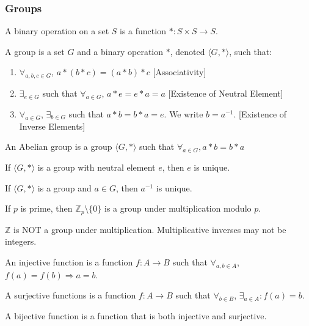 \documentclass[crop=false,class=book,oneside]{standalone}
\begin{document}
\subsubsection{Groups}
\begin{definition}
A binary operation on a set $S$ is a function $*:S\times S \rightarrow S$.
\end{definition}
\begin{definition}
A group is a set $G$ and a binary operation $*$, denoted $\langle G,*\rangle$, such that:
\begin{enumerate}
    \item $\forall_{a,b,c\in G}$, $a*(b*c) = (a*b)*c$ \hfill [Associativity]
    \item $\exists_{e\in G}$ such that $\forall_{a\in G}$, $a*e=e*a = a$ \hfill [Existence of Neutral Element]
    \item $\forall_{a\in G}$, $\exists_{b\in G}$ such that $a*b = b*a = e$. We write $b=a^{-1}$. \hfill [Existence of Inverse Elements]
\end{enumerate}
\end{definition}
\begin{definition}
An Abelian group is a group $\langle G,*\rangle$ such that $\forall_{a\in G},a*b=b*a$
\end{definition}
\begin{theorem}
If $\langle G, *\rangle$ is a group with neutral element $e$, then $e$ is unique.
\end{theorem}
\begin{theorem}
If $\langle G,*\rangle$ is a group and $a\in G$, then $a^{-1}$ is unique.
\end{theorem}
\begin{theorem}
If $p$ is prime, then $\mathbb{Z}_p\setminus \{0\}$ is a group under multiplication modulo $p$.
\end{theorem}
\begin{remark}
$\mathbb{Z}$ is NOT a group under multiplication. Multiplicative inverses may not be integers.
\end{remark}
\begin{definition}
An injective function is a function $f:A\rightarrow B$ such that $\forall_{a,b\in A}$, $f(a)=f(b)\Rightarrow a=b$.
\end{definition}
\begin{definition}
A surjective functions is a function $f:A\rightarrow B$ such that $\forall_{b\in B}$, $\exists_{a\in A}:f(a)=b$.
\end{definition}
\begin{definition}
A bijective function is a function that is both injective and surjective.
\end{definition}
\end{document}
